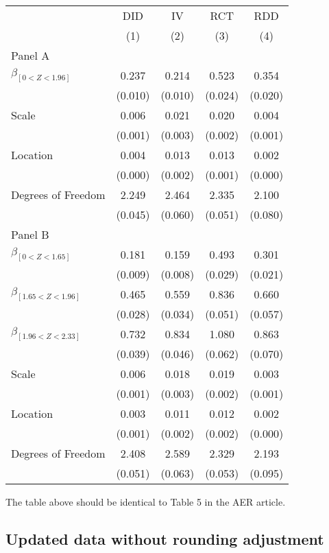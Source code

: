 \documentclass[
]{article}
\begin{document}
\def\sym#1{\ifmmode^{#1}\else\(^{#1}\)\fi} \begin{tabular}{l*{4}{c}} \hline\hline & \multicolumn{1}{c}{DID} &  \multicolumn{1}{c}{IV} &  \multicolumn{1}{c}{RCT} &  \multicolumn{1}{c}{RDD}\\  & \multicolumn{1}{c}{(1)} &  \multicolumn{1}{c}{(2)} &  \multicolumn{1}{c}{(3)} &  \multicolumn{1}{c}{(4)}\\  \hline \hline  Panel A \\  $\beta_{[0 < Z < 1.96]}$ & 0.237 &  0.214 &  0.523 &  0.354\\ & (0.010) &  (0.010) &  (0.024) &  (0.020)\\  Scale & 0.006 &  0.021 &  0.020 &  0.004\\ & (0.001) &  (0.003) &  (0.002) &  (0.001) \\  Location & 0.004 &  0.013 &  0.013 &  0.002\\ & (0.000) &  (0.002) &  (0.001) &  (0.000) \\  Degrees of Freedom & 2.249 &  2.464 &  2.335 &  2.100\\ & (0.045) &  (0.060) &  (0.051) &  (0.080)\\ Panel B \\  $\beta_{[0 < Z < 1.65]}$ & 0.181 &  0.159 &  0.493 &  0.301\\ & (0.009) &  (0.008) &  (0.029) &  (0.021)\\  $\beta_{[1.65 < Z < 1.96]}$ & 0.465 &  0.559 &  0.836 &  0.660\\ & (0.028) &  (0.034) &  (0.051) &  (0.057)\\   $\beta_{[1.96 < Z < 2.33]}$ & 0.732 &  0.834 &  1.080 &  0.863\\ & (0.039) &  (0.046) &  (0.062) &  (0.070)\\  Scale & 0.006 &  0.018 &  0.019 &  0.003\\ & (0.001) &  (0.003) &  (0.002) &  (0.001) \\  Location & 0.003 &  0.011 &  0.012 &  0.002\\ & (0.001) &  (0.002) &  (0.002) &  (0.000) \\  Degrees of Freedom & 2.408 &  2.589 &  2.329 &  2.193\\ & (0.051) &  (0.063) &  (0.053) &  (0.095)\\  \hline\hline \end{tabular}

The table above should be identical to Table 5 in the AER article.

\hypertarget{updated-data-without-rounding-adjustment}{%
\subsection{Updated data without rounding
adjustment}\label{updated-data-without-rounding-adjustment}}
\end{document}
